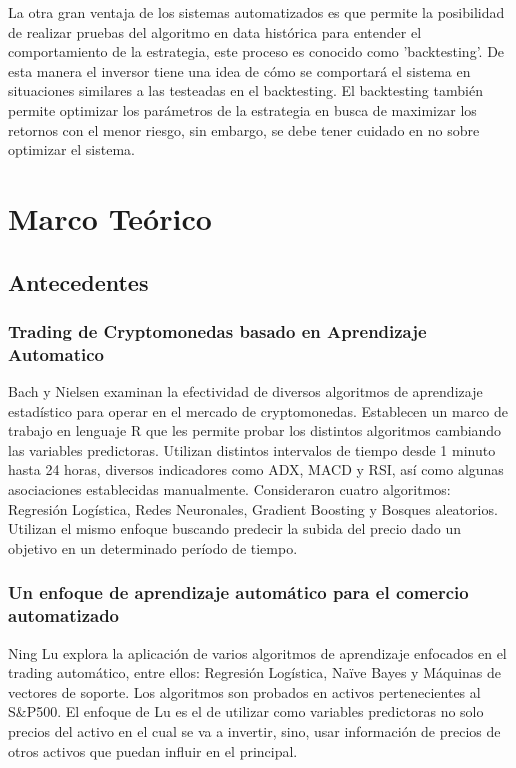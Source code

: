\documentclass[a4paper,12pt]{Latex/Classes/PhDthesisPSnPDF}
\begin{document}
La otra gran ventaja de los sistemas automatizados es que permite la posibilidad de realizar pruebas del algoritmo en data histórica para entender el comportamiento de la estrategia, este proceso es conocido como 'backtesting'. De esta manera el inversor tiene una idea de cómo se comportará el sistema en situaciones similares a las testeadas en el backtesting. El backtesting también permite optimizar los parámetros de la estrategia en busca de maximizar los retornos con el menor riesgo, sin embargo, se debe tener cuidado en no sobre optimizar el sistema. 

\chapter{Marco Teórico}

\section{Antecedentes}

\subsection{Trading de Cryptomonedas basado en Aprendizaje Automatico}

Bach y Nielsen examinan la efectividad de diversos algoritmos de aprendizaje estadístico para operar en el mercado de cryptomonedas. Establecen un marco de trabajo en lenguaje R que les permite probar los distintos algoritmos cambiando las variables predictoras. Utilizan distintos intervalos de tiempo desde 1 minuto hasta 24 horas, diversos indicadores como ADX, MACD y RSI, así como algunas asociaciones establecidas manualmente. Consideraron cuatro algoritmos: Regresión Logística, Redes Neuronales, Gradient Boosting y Bosques aleatorios. Utilizan el mismo enfoque buscando predecir la subida del precio dado un objetivo en un determinado período de tiempo.

\subsection{Un enfoque de aprendizaje automático para el comercio automatizado}

Ning Lu explora la aplicación de varios algoritmos de aprendizaje enfocados en el trading automático, entre ellos: Regresión Logística, Naïve Bayes y Máquinas de vectores de soporte. Los algoritmos son probados en activos pertenecientes al S\&P500. El enfoque de Lu es el de utilizar como variables predictoras no solo precios del activo en el cual se va a invertir, sino, usar información de precios de otros activos que puedan influir en el principal.
\end{document}
